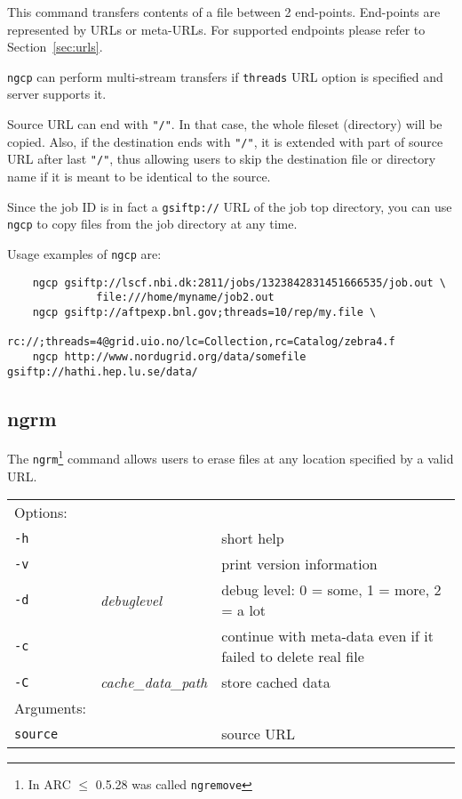 This command transfers contents of a file between 2 end-points.
End-points are represented by URLs or meta-URLs. For supported
endpoints please refer to Section~\ref{sec:urls}.

\texttt{ngcp} can perform multi-stream transfers if \texttt{threads}
URL option is specified and server supports it.

Source URL can end with \verb#"/"#. In that case, the whole fileset
(directory) will be copied. Also, if the destination ends with
\verb#"/"#, it is extended with part of source URL after last
\verb#"/"#, thus allowing users to skip the destination file or
directory name if it is meant to be identical to the source.

\begin{framed}
   Since the job ID is in fact a \verb#gsiftp://# URL of the job
   top directory, you can use \texttt{ngcp} to copy files from the
   job directory at any time.
\end{framed}

Usage examples of \texttt{ngcp} are:

\begin{verbatim}
    ngcp gsiftp://lscf.nbi.dk:2811/jobs/1323842831451666535/job.out \
              file:///home/myname/job2.out
    ngcp gsiftp://aftpexp.bnl.gov;threads=10/rep/my.file \
              rc://;threads=4@grid.uio.no/lc=Collection,rc=Catalog/zebra4.f
    ngcp http://www.nordugrid.org/data/somefile gsiftp://hathi.hep.lu.se/data/
\end{verbatim}

\subsection{ngrm}\label{sec:ngrm}

The \texttt{ngrm}\footnote{In ARC $\leq$ 0.5.28 was called
  \texttt{ngremove}} 
command allows users to erase files at any location specified by a
valid URL.
\hspace*{0.5cm}
\begin{shaded}
\end{shaded}
\begin{longtable}{llp{8cm}}
    Options:&&\\
    \texttt{-h} && short help\\
    \texttt{-v} && print version information\\
    \texttt{-d} & \textit{debuglevel} &debug level: 0 = some, 1 = more, 2 = a lot \\
    \texttt{-c} & &continue with meta-data even if it failed to delete real file\\
    \texttt{-C} & \textit{cache\_data\_path} & store cached data\\
    Arguments:&&\\
    \texttt{source} && source URL\\
\end{longtable}

